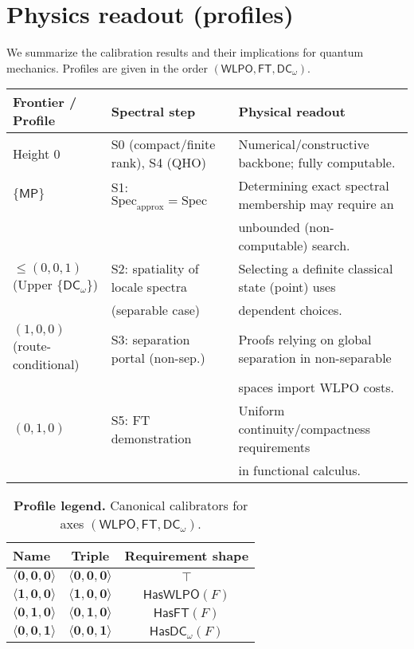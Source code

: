 \documentclass[11pt]{article}
\newcommand{\WLPO}{\mathsf{WLPO}}
\newcommand{\FT}{\mathsf{FT}}
\newcommand{\DCw}{\mathsf{DC}_{\omega}}
\newcommand{\MP}{\mathsf{MP}}
\newcommand{\hzero}{\mathbf{0}}
\newcommand{\hone}{\mathbf{1}}
\newcommand{\allzero}{\langle \hzero,\hzero,\hzero\rangle}
\newcommand{\WLPOonly}{\langle \hone,\hzero,\hzero\rangle}
\newcommand{\FTonly}{\langle \hzero,\hone,\hzero\rangle}
\newcommand{\DCwonly}{\langle \hzero,\hzero,\hone\rangle}
\theoremstyle{plain}
\theoremstyle{definition}
\theoremstyle{remark}
\newcommand{\HasWLPO}{\mathsf{HasWLPO}}
\newcommand{\HasFT}{\mathsf{HasFT}}
\newcommand{\HasDCw}{\mathsf{HasDC}_\omega}
\begin{document}
\section{Physics readout (profiles)}

We summarize the calibration results and their implications for quantum mechanics. Profiles are given in the order $(\WLPO, \FT, \DCw)$.

\begin{center}
\begin{tabular}{|l|l|l|}
\hline
\textbf{Frontier / Profile} & \textbf{Spectral step} & \textbf{Physical readout} \\
\hline
Height $0$ & S0 (compact/finite rank), S4 (QHO) & Numerical/constructive backbone; fully computable. \\
\hline
$\{\MP\}$ & S1: $\mathrm{Spec}_{\mathrm{approx}}=\mathrm{Spec}$ & Determining exact spectral membership may require an \\
& & unbounded (non-computable) search. \\
\hline
$\le (0,0,1)$ (Upper $\{\DCw\}$) & S2: spatiality of locale spectra & Selecting a definite classical state (point) uses \\
& (separable case) & dependent choices. \\
\hline
$(1,0,0)$ (route-conditional) & S3: separation portal (non-sep.) & Proofs relying on global separation in non-separable \\
& & spaces import WLPO costs. \\
\hline
$(0,1,0)$ & S5: FT demonstration & Uniform continuity/compactness requirements \\
& & in functional calculus. \\
\hline
\end{tabular}
\end{center}

\begin{table}[t]
  \centering
  \setlength{\tabcolsep}{8pt}
  \renewcommand{\arraystretch}{1.15}
  \begin{tabular}{l c c}
  \hline
  Name & Triple & Requirement shape \\ \hline
  $\allzero$    & $\langle\hzero,\hzero,\hzero\rangle$ & $\top$ \\
  $\WLPOonly$   & $\langle\hone,\hzero,\hzero\rangle$  & $\HasWLPO(F)$ \\
  $\FTonly$     & $\langle\hzero,\hone,\hzero\rangle$  & $\HasFT(F)$ \\
  $\DCwonly$    & $\langle\hzero,\hzero,\hone\rangle$  & $\HasDCw(F)$ \\
  \hline
  \end{tabular}
  \caption{\textbf{Profile legend.} Canonical calibrators for axes $(\WLPO,\FT,\DCw)$.}
  \label{tab:profile-legend}
\end{table}
\end{document}
